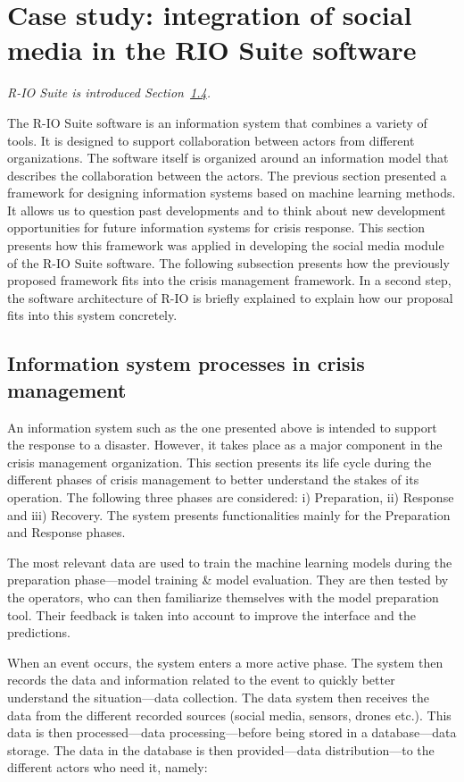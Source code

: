 \section{Case study: integration of social media in the RIO Suite software}
\textit{R-IO Suite is introduced Section~\hyperref[sec:academic-domains]{1.4}.}

The R-IO Suite software is an information system that combines a variety of tools.
It is designed to support collaboration between actors from different organizations.
The software itself is organized around an information model that describes the collaboration between the actors.
The previous section presented a framework for designing information systems based on machine learning methods.
It allows us to question past developments and to think about new development opportunities for future information systems for crisis response.
This section presents how this framework was applied in developing the social media module of the R-IO Suite software.
The following subsection presents how the previously proposed framework fits into the crisis management framework.
In a second step, the software architecture of R-IO is briefly explained to explain how our proposal fits into this system concretely.

\subsection{Information system processes in crisis management}
An information system such as the one presented above is intended to support the response to a disaster.
However, it takes place as a major component in the crisis management organization.
This section presents its life cycle during the different phases of crisis management to better understand the stakes of its operation.
The following three phases are considered: i) Preparation, ii) Response and iii) Recovery.
The system presents functionalities mainly for the Preparation and Response phases.

The most relevant data are used to train the machine learning models during the preparation phase—model training \& model evaluation.
They are then tested by the operators, who can then familiarize themselves with the model preparation tool.
Their feedback is taken into account to improve the interface and the predictions.

When an event occurs, the system enters a more active phase.
The system then records the data and information related to the event to quickly better understand the situation—data collection.
The data system then receives the data from the different recorded sources (social media, sensors, drones etc.).
This data is then processed—data processing—before being stored in a database—data storage.
The data in the database is then provided—data distribution—to the different actors who need it, namely:

